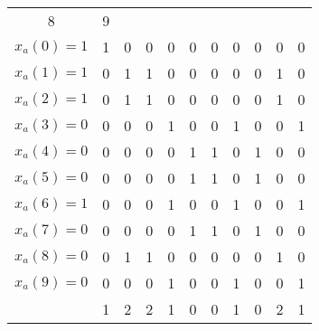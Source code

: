 \documentclass[conference]{IEEEtran}
\begin{document}
\begin{table*}
\begin{subtable}[b]{0.45\linewidth}
\begin{tabular}{c|c|c|c|c|c|c|c|c|c|c|}
	\multicolumn{1}{c}{8} &  \multicolumn{1}{c}{9} \\ \cline{2-11}
	{\color{red} $x_{a}(0)=1$} & {\color{red} 1} & {\color{red} 0} & {\color{red} 0} & {\color{red} 0} & {\color{red} 0} & {\color{red} 0} & {\color{red} 0} & {\color{red} 0} & {\color{red} 0} & {\color{red} 0} \\ \cline{2-11}
	{\color{red} $x_{a}(1)=1$} & {\color{red} 0} & {\color{red} 1} & {\color{red} 1} & {\color{red} 0} & {\color{red} 0} & {\color{red} 0} & {\color{red} 0} & {\color{red} 0} & {\color{red} 1} & {\color{red} 0} \\ \cline{2-11}
	{\color{red} $x_{a}(2)=1$} & {\color{red} 0} & {\color{red} 1} & {\color{red} 1} & {\color{red} 0} & {\color{red} 0} & {\color{red} 0} & {\color{red} 0} & {\color{red} 0} & {\color{red} 1} & {\color{red} 0} \\ \cline{2-11}
	$x_{a}(3)=0$ & 0 & 0 & 0 & 1 & 0 & 0 & 1 & 0 & 0 & 1 \\ \cline{2-11}
	$x_{a}(4)=0$ & 0 & 0 & 0 & 0 & 1 & 1 & 0 & 1 & 0 & 0 \\ \cline{2-11}
	$x_{a}(5)=0$ & 0 & 0 & 0 & 0 & 1 & 1 & 0 & 1 & 0 & 0 \\ \cline{2-11}
	{\color{red} $x_{a}(6)=1$} & {\color{red} 0} & {\color{red} 0} & {\color{red} 0} & {\color{red} 1} & {\color{red} 0} & {\color{red} 0} & {\color{red} 1} & {\color{red} 0} & {\color{red} 0} & {\color{red} 1} \\ \cline{2-11}
	$x_{a}(7)=0$ & 0 & 0 & 0 & 0 & 1 & 1 & 0 & 1 & 0 & 0 \\ \cline{2-11}
	$x_{a}(8)=0$ & 0 & 1 & 1 & 0 & 0 & 0 & 0 & 0 & 1 & 0 \\ \cline{2-11}
	$x_{a}(9)=0$ & 0 & 0 & 0 & 1 & 0 & 0 & 1 & 0 & 0 & 1 \\ \cline{2-11}
	\multicolumn{1}{c}{} & \multicolumn{1}{c}{{\color{blue}1}} & \multicolumn{1}{c}{{\color{blue}2}} & \multicolumn{1}{c}{{\color{blue}2}} & \multicolumn{1}{c}{{\color{blue}1}} & \multicolumn{1}{c}{{\color{blue}0}} & \multicolumn{1}{c}{{\color{blue}0}} & \multicolumn{1}{c}{{\color{blue}1}} & \multicolumn{1}{c}{{\color{blue}0}} & \multicolumn{1}{c}{{\color{blue}2}} & \multicolumn{1}{c}{{\color{blue}1}} \\
	\end{tabular}	
	\caption{}
	\label{table:mat3}
\end{subtable}
\hspace{2em}
\begin{subtable}[b]{0.45\linewidth}
	\begin{tabular}{c|c|c|c|c|c|c|c|c|c|c|}

\end{tabular}
\end{subtable}
\end{table*}
\end{document}
